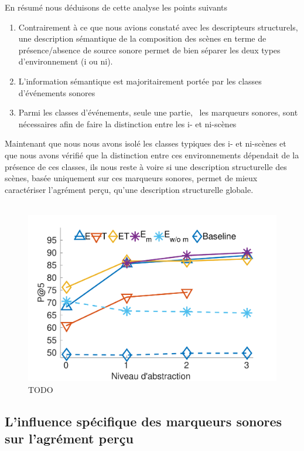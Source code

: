 En résumé nous déduisons de cette analyse les points suivants

\begin{enumerate}
\item Contrairement à ce que nous avions constaté avec les descripteurs structurels, une description sémantique de la composition des scènes en terme de présence/absence de source sonore permet de bien séparer les deux types d'environnement (i ou ni).
\item L'information sémantique est majoritairement portée par les classes d'événements sonores
\item Parmi les classes d'événements, seule une partie, \ie~les marqueurs sonores, sont nécessaires afin de faire la distinction entre les i- et ni-scènes
\end{enumerate}

Maintenant que nous nous avons isolé les classes typiques des i- et ni-scènes et que nous avons vérifié que la distinction entre ces environnements dépendait de la présence de ces classes, ils nous reste à voire si une description structurelle  des scènes, basée uniquement sur ces marqueurs sonores, permet de mieux caractériser l'agrément perçu, qu'une description structurelle globale. \\

\\

\begin{figure}[t]
        \myfloatalign
        \includegraphics[width=.9\linewidth]{gfxXpUrbanSoundscape/pa5_1}
       \caption[TODO]{TODO}\label{fig:pa5}
\end{figure}

\subsection{L'influence spécifique des marqueurs sonores sur l'agrément perçu}

